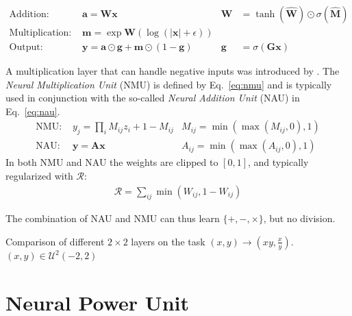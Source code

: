 \documentclass[9pt]{article}
\begin{document}
\begin{align}
  \label{eq:nalu_add}
  \text{Addition: }       & \bm a = \bm W \bm x
                          & \bm W& = \tanh(\hat{\bm W}) \odot \sigma(\hat{\bm M}) \\
  \label{eq:nalu_mult}
  \text{Multiplication: } & \bm m = \exp \bm W(\log(|\bm x|+\epsilon)) & &\\
  \text{Output: }         & \bm y = \bm a \odot \bm g + \bm m \odot (1-\bm g) 
                          & \bm g& = \sigma(\bm G\bm x)
\end{align}

A multiplication layer that can handle negative inputs was introduced by \citet{madsen_neural_2020}.
The \emph{Neural Multiplication Unit} (NMU) is defined by Eq.~\ref{eq:nmu} and is typically used in
conjunction with the so-called \emph{Neural Addition Unit} (NAU) in Eq.~\ref{eq:nau}.
\begin{align}
  \label{eq:nmu}
  \text{NMU: } &y_j = \prod_i M_{ij} z_{i} + 1 - M_{ij}  &M_{ij}=\min(\max(M_{ij}, 0), 1)\\
  \label{eq:nau}
  \text{NAU: } &\bm y = \bm A \bm x &A_{ij}=\min(\max(A_{ij}, 0), 1)
\end{align}
In both NMU and NAU the weights are clipped to $[0,1]$, and typically regularized
with $\mathcal{R}$:
\begin{align}
  \label{eq:rsparse}
  \mathcal{R} = \sum_{ij} \min(W_{ij}, 1-W_{ij})
\end{align}

The combination of NAU and NMU can thus learn $\{+,-,\times\}$, but no division.


\begin{table}
  \centering
  \caption{Comparison of different $2\times2$ layers on the task $(x,y)\rightarrow(xy,\frac{x}{y})$.
  $(x,y) \in \mathcal U^2(-2,2)$}
  \label{tab:label}
  
\end{table}

\section{Neural Power Unit}%
\label{sec:neural_power_unit}
\end{document}
